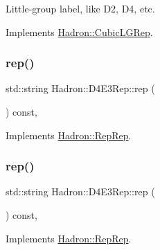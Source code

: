 Little-\/group label, like D2, D4, etc. 

Implements \mbox{\hyperlink{structHadron_1_1CubicLGRep_a9bdb14b519a611d21379ed96a3a9eb41}{Hadron\+::\+Cubic\+L\+G\+Rep}}.

\mbox{\label{structHadron_1_1D4E3Rep_aee1429ccf3e674cb3d5bad78d15a0e33}} 
\subsubsection{\texorpdfstring{rep()}{rep()}\hspace{0.1cm}{\footnotesize\ttfamily [1/5]}}
{\footnotesize\ttfamily std\+::string Hadron\+::\+D4\+E3\+Rep\+::rep (\begin{DoxyParamCaption}{ }\end{DoxyParamCaption}) const\hspace{0.3cm}{\ttfamily [inline]}, {\ttfamily [virtual]}}



Implements \mbox{\hyperlink{structHadron_1_1RepRep_ab3213025f6de249f7095892109575fde}{Hadron\+::\+Rep\+Rep}}.

\mbox{\label{structHadron_1_1D4E3Rep_aee1429ccf3e674cb3d5bad78d15a0e33}} 
\subsubsection{\texorpdfstring{rep()}{rep()}\hspace{0.1cm}{\footnotesize\ttfamily [2/5]}}
{\footnotesize\ttfamily std\+::string Hadron\+::\+D4\+E3\+Rep\+::rep (\begin{DoxyParamCaption}{ }\end{DoxyParamCaption}) const\hspace{0.3cm}{\ttfamily [inline]}, {\ttfamily [virtual]}}



Implements \mbox{\hyperlink{structHadron_1_1RepRep_ab3213025f6de249f7095892109575fde}{Hadron\+::\+Rep\+Rep}}.

\mbox{\label{structHadron_1_1D4E3Rep_aee1429ccf3e674cb3d5bad78d15a0e33}} 
